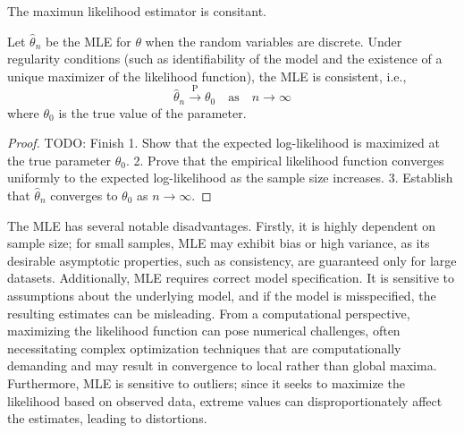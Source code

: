 The maximun likelihood estimator is consitant.

\begin{proposition}
Let \( \hat{\theta}_n \) be the MLE for \( \theta \) when the random variables are discrete. Under regularity conditions (such as identifiability of the model and the existence of a unique maximizer of the likelihood function), the MLE is consistent, i.e.,
\[
\hat{\theta}_n \xrightarrow{\text{P}} \theta_0 \quad \text{as} \quad n \to \infty
\]
where \( \theta_0 \) is the true value of the parameter.
\end{proposition}
\begin{proof}
{\color{red} TODO: Finish}
1. Show that the expected log-likelihood is maximized at the true parameter \( \theta_0 \).
2. Prove that the empirical likelihood function converges uniformly to the expected log-likelihood as the sample size increases.
3. Establish that \( \hat{\theta}_n \) converges to \( \theta_0 \) as \( n \to \infty \).
\end{proof}

The MLE has several notable disadvantages. Firstly, it is highly dependent on sample size; for small samples, MLE may exhibit bias or high variance, as its desirable asymptotic properties, such as consistency, are guaranteed only for large datasets. Additionally, MLE requires correct model specification. It is sensitive to assumptions about the underlying model, and if the model is misspecified, the resulting estimates can be misleading. From a computational perspective, maximizing the likelihood function can pose numerical challenges, often necessitating complex optimization techniques that are computationally demanding and may result in convergence to local rather than global maxima. Furthermore, MLE is sensitive to outliers; since it seeks to maximize the likelihood based on observed data, extreme values can disproportionately affect the estimates, leading to distortions.

